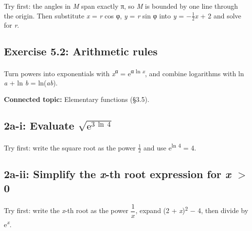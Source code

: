 \documentclass[11pt]{article}
\begin{document}
\begin{keepsection}
\begin{keepsection}
Try first: the angles in \textit{M} span exactly π, so \textit{M} is bounded by one line through the origin. Then substitute \textit{x} = \textit{r} cos φ, \textit{y} = \textit{r} sin φ into \textit{y} = \ensuremath{-}\ensuremath{\tfrac12}\textit{x} + 2 and solve for \textit{r}.

\end{keepsection}
\end{keepsection}

\begin{keepsection}
\section{Exercise 5.2: Arithmetic rules}

Turn powers into exponentials with \textit{x}\textsuperscript{α} = e\textsuperscript{α ln \textit{x}}, and combine logarithms with ln \textit{a} + ln \textit{b} = ln(\textit{ab}).

\textbf{Connected topic:} Elementary functions (§3.5).

\begin{keepsection}
\subsection{2a-i: Evaluate \ensuremath{\sqrt{\mathrm{e}^{3\, \ln \, 4}}}}

Try first: write the square root as the power \ensuremath{\tfrac12} and use e\textsuperscript{ln 4} = 4.

\end{keepsection}

\begin{keepsection}
\subsection{2a-ii: Simplify the \textit{x}-th root expression for \textit{x} \ensuremath{>} 0}

Try first: write the \textit{x}-th root as the power {\small\ensuremath{\dfrac{1}{{x}}}}, expand (2 + \textit{x})\textsuperscript{2} \ensuremath{-} 4, then divide by e\textsuperscript{\textit{x}}.


\end{keepsection}
\end{keepsection}
\end{document}
